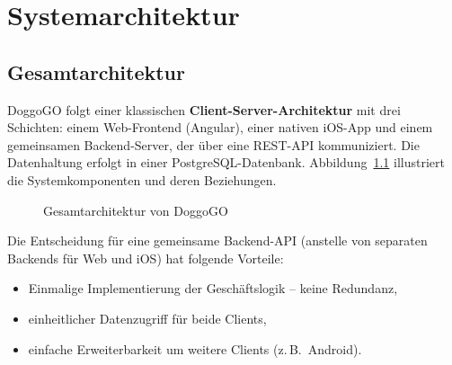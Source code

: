 \chapter{Systemarchitektur}
\label{chap:architektur}

\section{Gesamtarchitektur}
\label{sec:gesamtarchitektur}

DoggoGO folgt einer klassischen \textbf{Client-Server-Architektur} mit drei Schichten:
einem Web-Frontend (Angular), einer nativen iOS-App und einem gemeinsamen Backend-Server,
der über eine REST-API kommuniziert. Die Datenhaltung erfolgt in einer PostgreSQL-Datenbank.
Abbildung~\ref{fig:gesamtarchitektur} illustriert die Systemkomponenten und deren Beziehungen.

\begin{figure}[H]
  \centering
  \caption{Gesamtarchitektur von DoggoGO}
  \label{fig:gesamtarchitektur}
\end{figure}

Die Entscheidung für eine gemeinsame Backend-API (anstelle von separaten Backends für Web
und iOS) hat folgende Vorteile:
\begin{itemize}
  \item Einmalige Implementierung der Geschäftslogik – keine Redundanz,
  \item einheitlicher Datenzugriff für beide Clients,
  \item einfache Erweiterbarkeit um weitere Clients (z.\,B.\ Android).
\end{itemize}


